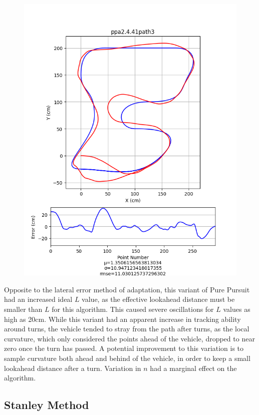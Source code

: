 \documentclass[mla7]{mla}
\begin{document}
\begin{paper}
\begin{figure}[H]
\endminipage\\
\includegraphics[width=\linewidth]{pathData/ppa2path3}
\endminipage
\end{figure}

Opposite to the lateral error method of adaptation, this variant of Pure Pursuit had an increased ideal $L$ value, as the effective lookahead distance must be smaller than $L$ for this algorithm. This caused severe oscillations for $L$ values as high as 20cm. While this variant had an apparent increase in tracking ability around turns, the vehicle tended to stray from the path after turns, as the local curvature, which only considered the points ahead of the vehicle, dropped to near zero once the turn has passed. A potential improvement to this variation is to sample curvature both ahead and behind of the vehicle, in order to keep a small lookahead distance after a turn. Variation in $n$ had a marginal effect on the algorithm.

\subsection{Stanley Method}


\end{paper}
\end{document}
